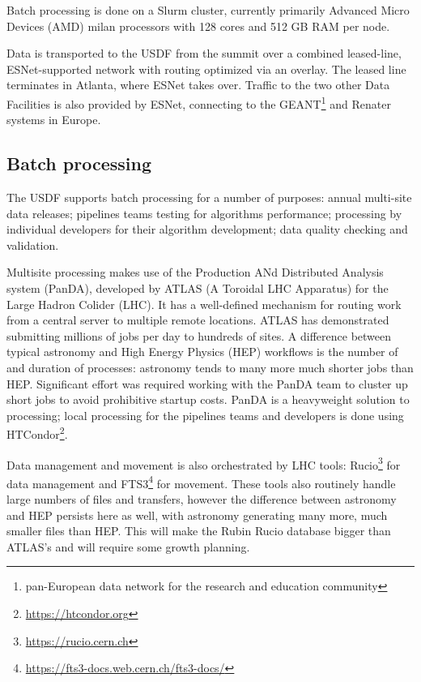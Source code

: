 Batch processing is done on a Slurm cluster, currently primarily Advanced Micro Devices (AMD) milan
processors with 128 cores and 512 GB RAM per node.

Data is transported to the USDF from the summit over a combined
leased-line, ESNet-supported network with routing optimized via an
overlay. The leased line terminates in Atlanta, where ESNet takes
over. Traffic to the two other Data Facilities is also provided by
ESNet, connecting to the GEANT\footnote{pan-European data network for the research and education community}
 and Renater systems in Europe.

\subsection{Batch processing}

The USDF supports batch processing for a number of purposes: annual
multi-site data releases; pipelines teams testing for algorithms
performance; processing by individual developers for their algorithm
development; data quality checking and validation.

Multisite processing makes use of the Production ANd Distributed Analysis system (PanDA),\cite{2024CSBS....8....4M} developed
by ATLAS (A Toroidal LHC Apparatus) for the Large Hadron Colider (LHC).
It has a well-defined mechanism for routing work
from a central server to multiple remote locations. ATLAS has
demonstrated submitting millions of jobs per day to hundreds of sites.
A difference between typical astronomy and High Energy Physics (HEP) workflows is the
number of and duration of processes: astronomy tends to many more much
shorter jobs than HEP.\cite{2023arXiv231204921K} Significant effort was required working with the PanDA
team to cluster up short jobs to avoid prohibitive startup costs.
PanDA is a heavyweight solution to processing; local processing for
the pipelines teams and developers is done using HTCondor\footnote{\url{https://htcondor.org}}.

Data management and movement is also orchestrated by LHC tools: Rucio\footnote{\url{https://rucio.cern.ch}}
for data management and FTS3\footnote{\url{https://fts3-docs.web.cern.ch/fts3-docs/}} for movement. These tools also routinely
handle large numbers of files and transfers, however the difference between astronomy
and HEP persists here as well, with astronomy generating many more,
much smaller files than HEP. This will make the Rubin Rucio database
bigger than ATLAS's and will require some growth planning.

